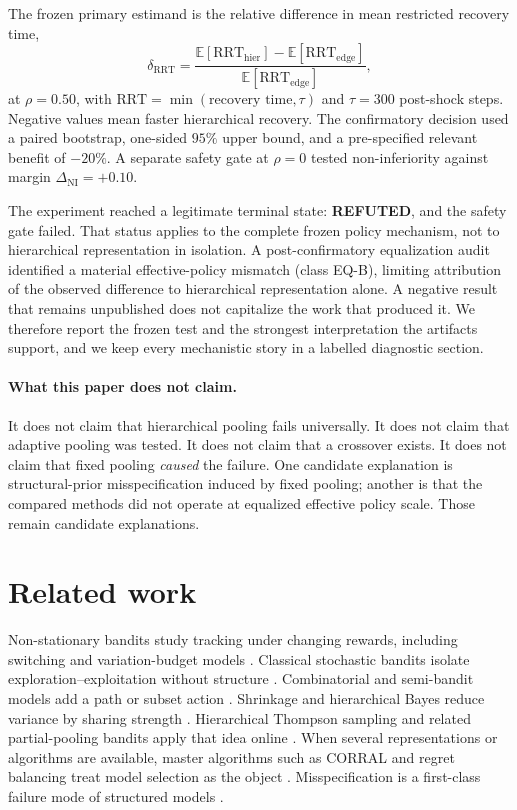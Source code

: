 \documentclass{article}
\newcommand{\rrt}{\mathrm{RRT}}
\newcommand{\deltaRRT}{\delta_{\rrt}}
\begin{document}
The frozen primary estimand is the relative difference in mean restricted recovery time,
\[
\deltaRRT
=
\frac{\mathbb{E}[\rrt_{\mathrm{hier}}]-\mathbb{E}[\rrt_{\mathrm{edge}}]}{\mathbb{E}[\rrt_{\mathrm{edge}}]},
\]
at $\rho=0.50$, with $\rrt=\min(\text{recovery time},\tau)$ and $\tau=300$ post-shock steps.
Negative values mean faster hierarchical recovery.
The confirmatory decision used a paired bootstrap, one-sided $95\%$ upper bound, and a pre-specified relevant benefit of $-20\%$.
A separate safety gate at $\rho=0$ tested non-inferiority against margin $\Delta_{\mathrm{NI}}=+0.10$.

The experiment reached a legitimate terminal state: \textbf{REFUTED}, and the safety gate failed.
That status applies to the complete frozen policy mechanism, not to hierarchical representation in isolation.
A post-confirmatory equalization audit identified a material effective-policy mismatch (class EQ-B), limiting attribution of the observed difference to hierarchical representation alone.
A negative result that remains unpublished does not capitalize the work that produced it.
We therefore report the frozen test and the strongest interpretation the artifacts support, and we keep every mechanistic story in a labelled diagnostic section.

\paragraph{What this paper does not claim.}
It does not claim that hierarchical pooling fails universally.
It does not claim that adaptive pooling was tested.
It does not claim that a crossover exists.
It does not claim that fixed pooling \emph{caused} the failure.
One candidate explanation is structural-prior misspecification induced by fixed pooling; another is that the compared methods did not operate at equalized effective policy scale.
Those remain candidate explanations.

\section{Related work}

Non-stationary bandits study tracking under changing rewards, including switching and variation-budget models \citep{garivier2011switching,besbes2014nonstationary,russac2019weighted}.
Classical stochastic bandits isolate exploration--exploitation without structure \citep{auer2002finite}.
Combinatorial and semi-bandit models add a path or subset action \citep{cesabianchi2012combinatorial,chen2013combinatorial,kveton2015tight}.
Shrinkage and hierarchical Bayes reduce variance by sharing strength \citep{james1961estimation,gelman2013bayesian}.
Hierarchical Thompson sampling and related partial-pooling bandits apply that idea online \citep{russo2018tutorial,hong2022hierarchical}.
When several representations or algorithms are available, master algorithms such as CORRAL and regret balancing treat model selection as the object \citep{agarwal2017corralling,pacchiano2020model}.
Misspecification is a first-class failure mode of structured models \citep{lattimore2020bandit}.
\end{document}
